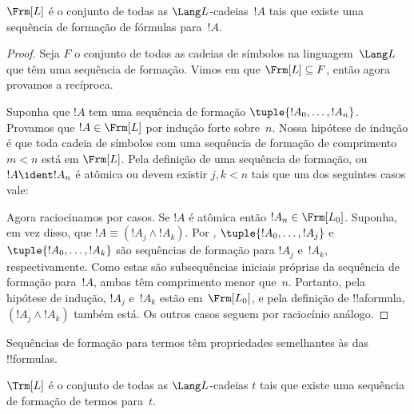 \documentclass[../../../include/open-logic-section]{subfiles}
\begin{document}
\begin{thm}
$\Frm[L]$ é o conjunto de todas as $\Lang L$-cadeias~$!A$ tais que
existe uma sequência de formação de fórmulas para~$!A$.
\end{thm}

\begin{proof}
Seja $F$ o conjunto de todas as cadeias de símbolos na linguagem~$\Lang L$
que têm uma sequência de formação. Vimos em
 que $\Frm[L] \subseteq F$, então agora
provamos a recíproca.

Suponha que $!A$ tem uma sequência de formação $\tuple{!A_0,\dotsc,!A_n}$.
Provamos que $!A \in \Frm[L]$ por indução forte sobre~$n$.
Nossa hipótese de indução é que toda cadeia de símbolos com uma
sequência de formação de comprimento $m < n$ está em $\Frm[L]$.
Pela definição de uma sequência de formação, ou $!A \ident !A_n$ é
atômica ou devem existir $j,k < n$ tais que um dos
seguintes casos vale:
\begin{enumerate}
\end{enumerate}
Agora raciocinamos por casos. Se $!A$ é atômica então
$!A_n \in \Frm[L_0]$. Suponha, em vez disso, que
$!A \equiv (!A_j \land !A_k)$. Por 
,
$\tuple{!A_0,\dotsc,!A_j}$ e $\tuple{!A_0,\dotsc,!A_k}$ são
sequências de formação para $!A_j$ e~$!A_k$, respectivamente. Como
estas são subsequências iniciais próprias da sequência de formação
para~$!A$, ambas têm comprimento menor que~$n$. Portanto, pela
hipótese de indução, $!A_j$ e~$!A_k$ estão em~$\Frm[L_0]$,
e pela definição de !!a{formula}, $(!A_j \land !A_k)$ também
está. Os outros casos seguem por raciocínio análogo.
\end{proof}

Sequências de formação para termos têm propriedades semelhantes às
das !!{formula}s.

\begin{prop}
$\Trm[L]$ é o conjunto de todas as $\Lang L$-cadeias $t$
tais que existe uma sequência de formação de termos para~$t$.
\end{prop}
\end{document}
